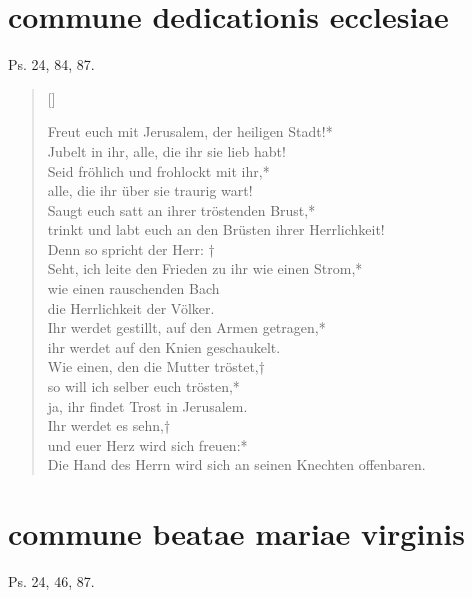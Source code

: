 
\thispagestyle{plain}



\section{commune dedicationis ecclesiae}

Ps. 24, 84, 87.

\begin{verse}[\versewidth]

Freut euch mit Jerusalem, der heiligen Stadt!*\\
Jubelt in ihr, alle, die ihr sie lieb habt!\\
\vin Seid fröhlich und frohlockt mit ihr,*\\
\vin alle, die ihr über sie traurig wart!\\
Saugt euch satt an ihrer tröstenden Brust,*\\
trinkt und labt euch an den Brüsten ihrer Herrlichkeit!\\

\vin Denn so spricht der Herr: †\\
\vin Seht, ich leite den Frieden zu ihr wie einen Strom,*\\
\vin wie einen rauschenden Bach\\ \vin die Herrlichkeit der Völker.\\
Ihr werdet gestillt, auf den Armen getragen,*\\
ihr werdet auf den Knien geschaukelt.\\
\vin Wie einen, den die Mutter tröstet,†\\
\vin so will ich selber euch trösten,*\\
\vin ja, ihr findet Trost in Jerusalem.\\
Ihr werdet es sehn,†\\
und euer Herz wird sich freuen:*\\
Die Hand des Herrn wird sich an seinen Knechten offenbaren.\\ 
 
\end{verse}

\newpage

\section{commune beatae mariae virginis}

Ps. 24, 46, 87.

